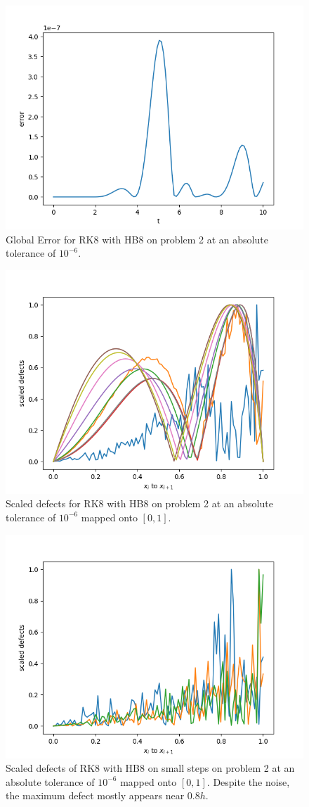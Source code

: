 \begin{figure}[H]
\centering
\includegraphics[width=0.7\linewidth]{./figures/rk8_with_hb8_p2_global_error}
\caption{Global Error for RK8 with HB8 on problem 2 at an absolute tolerance of $10^{-6}$.}
\label{fig:rk8_with_hb8_p2_global_error}
\end{figure}

\begin{figure}[H]
\centering
\includegraphics[width=0.7\linewidth]{./figures/rk8_with_hb8_p2_scaled_defects}
\caption{Scaled defects for RK8 with HB8 on problem 2 at an absolute tolerance of $10^{-6}$  mapped onto $[0, 1]$.}
\label{fig:rk8_with_hb8_p2_scaled_defects}
\end{figure}

\begin{figure}[H]
\centering
\includegraphics[width=0.7\linewidth]{./figures/rk8_with_hb8_p2_scaled_defects_small_steps}
\caption{Scaled defects of RK8 with HB8 on small steps on problem 2 at an absolute tolerance of $10^{-6}$ mapped onto $[0, 1]$. Despite the noise, the maximum defect mostly appears near $0.8h$.}
\label{fig:rk8_with_hb8_p2_scaled_defects_small_steps}
\end{figure}

